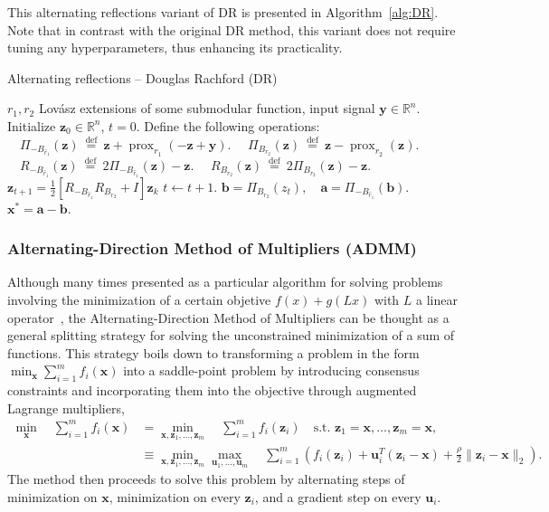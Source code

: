 \documentclass[twoside,11pt]{article}
\newcommand{\va}{\bm{a}}       \newcommand{\vah}{\hat{\bm{a}}}        \newcommand{\ah}{\hat{a}}    \newcommand{\vat}{\tilde{\bm{a}}}       \newcommand{\at}{\tilde{a}}
\newcommand{\vb}{\bm{b}}       \newcommand{\vbh}{\hat{\bm{b}}}        \newcommand{\bh}{\hat{b}}    \newcommand{\vbt}{\tilde{\bm{b}}}       \newcommand{\bt}{\tilde{b}}
\newcommand{\vu}{\bm{u}}       \newcommand{\vuh}{\hat{\bm{u}}}        \newcommand{\uh}{\hat{u}}    \newcommand{\vut}{\tilde{\bm{u}}}       \newcommand{\ut}{\tilde{u}}
\newcommand{\vx}{\bm{x}}       \newcommand{\vxh}{\hat{\bm{x}}}        \newcommand{\xh}{\hat{x}}    \newcommand{\vxt}{\tilde{\bm{x}}}       \newcommand{\xt}{\tilde{x}}
\newcommand{\vy}{\bm{y}}       \newcommand{\vyh}{\hat{\bm{y}}}        \newcommand{\yh}{\hat{y}}    \newcommand{\vyt}{\tilde{\bm{y}}}       \newcommand{\yt}{\tilde{y}}
\newcommand{\vz}{\bm{z}}       \newcommand{\vzh}{\hat{\bm{z}}}        \newcommand{\zh}{\hat{z}}    \newcommand{\vzt}{\tilde{\bm{z}}}       \newcommand{\zt}{\tilde{z}}
\newcommand{\mynorm}[2]{\| {#1} \|_{#2}}
\newcommand{\enorm}[1]{\mynorm{#1}{2}}
\DeclareMathOperator{\prox}{prox}
\newcommand{\defeq}{\ \stackrel{\text{def}}{=}\ }
\newcommand{\reals}{\mathbb{R}}
\newcommand{\half}{\tfrac{1}{2}}
\numberwithin{equation}{section}
\numberwithin{theorem}{section}
\begin{document}
This alternating reflections variant of DR is presented in Algorithm~\ref{alg:DR}. Note that in contrast with the original DR method, this variant does not require tuning any hyperparameters, thus enhancing its practicality.

\begin{algorithm}
 \caption{
    \label{alg:DR}
    Alternating reflections -- Douglas Rachford (DR)
 }
 \begin{algorithmic}
   $r_1,r_2$ Lovász extensions of some submodular function, input signal $\vy \in \reals^n$.
  \State Initialize $\vz_0 \in \reals^n$, $t=0$.
  \State Define the following operations:
  \State $\quad \Pi_{-B_{\hat r_1}}(\vz) \defeq \vz + \prox_{r_1}(-\vz + \vy)$.
  \State $\quad \Pi_{B_{r_2}}(\vz) \defeq \vz - \prox_{r_2}(\vz)$.
  \State $\quad R_{-B_{\hat r_1}}(\vz) \defeq 2 \Pi_{-B_{\hat r_1}}(\vz) - \vz$.
  \State $\quad R_{B_{r_2}}(\vz) \defeq 2 \Pi_{B_{r_2}}(\vz) - \vz$.
   \State $\vz_{t+1} = \half \left[R_{-B_{\hat r_1}} R_{B_{r_2}} + I \right] \vz_k$
   \State $t \gets t+1$.
  \EndWhile
  \State $\vb = \Pi_{B_{r_2}}(z_t), \quad \va = \Pi_{-B_{\hat r_1}}(\vb)$.
   $\vx^* = \va - \vb$.
 \end{algorithmic}
\end{algorithm}

\subsubsection{Alternating-Direction Method of Multipliers (ADMM)}
\label{sec:ADMM}

Although many times presented as a particular algorithm for solving problems involving the minimization of a certain objetive $f(x) + g(Lx)$ with $L$ a linear operator~\citep{Combettes09}, the Alternating-Direction Method of Multipliers can be thought as a general splitting strategy for solving the unconstrained minimization of a sum of functions. This strategy boils down to transforming a problem in the form $\min_{\vx} \sum_{i=1}^m f_i(\vx)$ into a saddle-point problem by introducing consensus constraints and incorporating them into the objective through augmented Lagrange multipliers,
\begin{align*}
 \min_{\vx} \quad \sum_{i=1}^m f_i(\vx) &= \min_{\vx, \vz_1, \ldots, \vz_m} \quad \sum_{i=1}^m f_i(\vz_i) \quad \text{s.t.} \,\, \vz_1 = \vx, \ldots, \vz_m = \vx , \\
  &\equiv \min_{\vx, \vz_1, \ldots, \vz_m} \max_{\vu_1, \ldots, \vu_m} \quad \sum_{i=1}^m \left( f_i(\vz_i) + \vu_i^T (\vz_i - \vx) + \frac{\rho}{2} \enorm{\vz_i - \vx} \right).
\end{align*}
The method then proceeds to solve this problem by alternating steps of minimization on $\vx$, minimization on every $\vz_i$, and a gradient step on every $\vu_i$.
\end{document}
